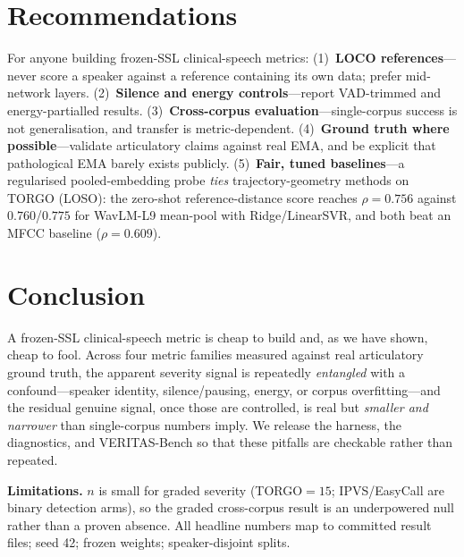 \documentclass[conference]{IEEEtran}
\begin{document}
\section{Recommendations}
For anyone building frozen-SSL clinical-speech metrics:
(1)~\textbf{LOCO references}---never score a speaker against a reference containing
its own data; prefer mid-network layers.
(2)~\textbf{Silence and energy controls}---report VAD-trimmed and energy-partialled
results.
(3)~\textbf{Cross-corpus evaluation}---single-corpus success is not generalisation,
and transfer is metric-dependent.
(4)~\textbf{Ground truth where possible}---validate articulatory claims against real
EMA, and be explicit that pathological EMA barely exists publicly.
(5)~\textbf{Fair, tuned baselines}---a regularised pooled-embedding probe
\emph{ties} trajectory-geometry methods on TORGO (LOSO): the zero-shot
reference-distance score reaches $\rho{=}0.756$ against $0.760$/$0.775$ for
WavLM-L9 mean-pool with Ridge/LinearSVR, and both beat an MFCC baseline
($\rho{=}0.609$).

\section{Conclusion}
A frozen-SSL clinical-speech metric is cheap to build and, as we have shown, cheap
to fool. Across four metric families measured against real articulatory ground
truth, the apparent severity signal is repeatedly \emph{entangled} with a
confound---speaker identity, silence/pausing,
energy, or corpus overfitting---and the residual genuine signal, once those are
controlled, is real but \emph{smaller and narrower} than single-corpus numbers
imply. We release the harness, the diagnostics, and VERITAS-Bench so that these
pitfalls are checkable rather than repeated.

\noindent\textbf{Limitations.} $n$ is small for graded severity (TORGO${=}15$;
IPVS/EasyCall are binary detection arms), so the graded cross-corpus result is an
underpowered null rather than a proven absence. All headline numbers map to
committed result files; seed 42; frozen weights; speaker-disjoint splits.
\end{document}

